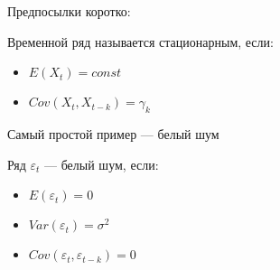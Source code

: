 \documentclass[ignorenonframetext,]{beamer}
\begin{document}
\begin{frame}{Предпосылки коротко:}

Временной ряд называется стационарным, если:

\begin{itemize}
\itemsep1pt\parskip0pt
\item
  $E(X_t)=const$
\item
  $Cov(X_t,X_{t-k})=\gamma_k$
\end{itemize}

\end{frame}

\begin{frame}{Самый простой пример --- белый шум}

Ряд $\varepsilon_t$ --- белый шум, если:

\begin{itemize}
\itemsep1pt\parskip0pt
\item
  $E(\varepsilon_t)=0$
\item
  $Var(\varepsilon_t)=\sigma^2$
\item
  $Cov(\varepsilon_t,\varepsilon_{t-k})=0$
\end{itemize}

\end{frame}
\end{document}
